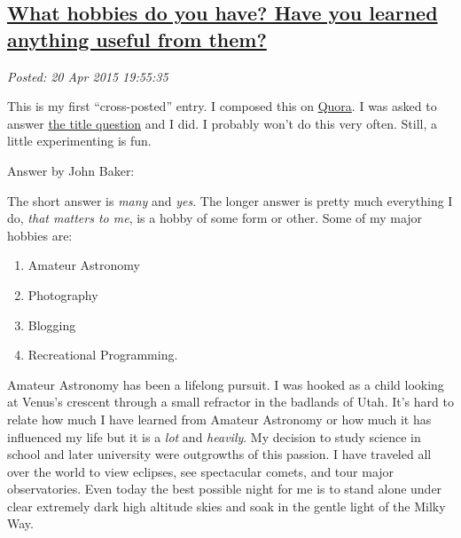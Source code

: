 %

\subsection*{\href{https://bakerjd99.wordpress.com/2015/04/20/what-hobbies-do-you-have-have-you-learned-anything-useful-from-them/}{What hobbies do you have? Have you learned anything useful from them?}}


\noindent\emph{Posted: 20 Apr 2015 19:55:35}
\vspace{6pt}

This is my first ``cross-posted'' entry. I composed this on
\href{https://www.quora.com/John-Baker-98/}{Quora}. I was asked to
answer \href{http://www.quora.com/What-hobbies-do-you-have-Have-you-learned-anything-useful-from-them/answer/John-Baker-98}{the title question} and I did. I probably won't do this very
often. Still, a little experimenting is fun.

\medskip
\noindent Answer by John Baker:
\medskip

The short answer is \emph{many} and \emph{yes}. The longer answer is
pretty much everything I do, \emph{that matters to me}, is a hobby of
some form or other. Some of my major hobbies are:

\begin{enumerate}
\itemsep1pt\parskip0pt
\item Amateur Astronomy

\item Photography

\item Blogging

\item Recreational Programming.
\end{enumerate}

Amateur Astronomy has been a lifelong pursuit. I was hooked as a child
looking at Venus's crescent through a small refractor in the badlands of
Utah. It's hard to relate how much I have learned from Amateur Astronomy
or how much it has influenced my life but it is a \emph{lot} and
\emph{heavily}. My decision to study science in school and later
university were outgrowths of this passion. I have traveled all over the
world to view eclipses, see spectacular comets, and tour major
observatories. Even today the best possible night for me is to stand
alone under clear extremely dark high altitude skies and soak in the
gentle light of the Milky Way.


